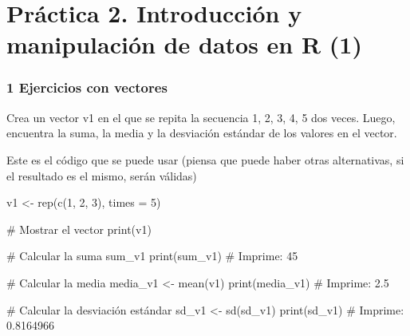 \documentclass[
  letterpaper,
  DIV=11,
  numbers=noendperiod]{scrreprt}
\newenvironment{Shaded}{\begin{snugshade}}{\end{snugshade}}
\newcommand{\AttributeTok}[1]{\textcolor[rgb]{0.40,0.45,0.13}{#1}}
\newcommand{\CommentTok}[1]{\textcolor[rgb]{0.37,0.37,0.37}{#1}}
\newcommand{\DecValTok}[1]{\textcolor[rgb]{0.68,0.00,0.00}{#1}}
\newcommand{\FunctionTok}[1]{\textcolor[rgb]{0.28,0.35,0.67}{#1}}
\newcommand{\NormalTok}[1]{\textcolor[rgb]{0.00,0.23,0.31}{#1}}
\newcommand{\OtherTok}[1]{\textcolor[rgb]{0.00,0.23,0.31}{#1}}
\begin{document}
\hypertarget{section}{%
\section{}\label{section}}

\hypertarget{pruxe1ctica-2.-introducciuxf3n-y-manipulaciuxf3n-de-datos-en-r-1-1}{%
\chapter{\texorpdfstring{{Práctica 2. Introducción y manipulación de
datos en R
(1)}}{Práctica 2. Introducción y manipulación de datos en R (1)}}\label{pruxe1ctica-2.-introducciuxf3n-y-manipulaciuxf3n-de-datos-en-r-1-1}}

\hypertarget{ejercicios-con-vectores-1}{%
\subsection{1 Ejercicios con vectores}\label{ejercicios-con-vectores-1}}

Crea un vector v1 en el que se repita la secuencia 1, 2, 3, 4, 5 dos
veces. Luego, encuentra la suma, la media y la desviación estándar de
los valores en el vector.

Este es el código que se puede usar (piensa que puede haber otras
alternativas, si el resultado es el mismo, serán válidas)

\begin{Shaded}
\begin{Highlighting}[]
\NormalTok{v1 }\OtherTok{\textless{}{-}} \FunctionTok{rep}\NormalTok{(}\FunctionTok{c}\NormalTok{(}\DecValTok{1}\NormalTok{, }\DecValTok{2}\NormalTok{, }\DecValTok{3}\NormalTok{), }\AttributeTok{times =} \DecValTok{5}\NormalTok{)}

\CommentTok{\# Mostrar el vector}
\FunctionTok{print}\NormalTok{(v1)}


\CommentTok{\# Calcular la suma}
\NormalTok{sum\_v1}
\FunctionTok{print}\NormalTok{(sum\_v1)}
\CommentTok{\# Imprime: 45}

\CommentTok{\# Calcular la media}
\NormalTok{media\_v1 }\OtherTok{\textless{}{-}} \FunctionTok{mean}\NormalTok{(v1)}
\FunctionTok{print}\NormalTok{(media\_v1)}
\CommentTok{\# Imprime: 2.5}

\CommentTok{\# Calcular la desviación estándar}
\NormalTok{sd\_v1 }\OtherTok{\textless{}{-}} \FunctionTok{sd}\NormalTok{(sd\_v1)}
\FunctionTok{print}\NormalTok{(sd\_v1)}
\CommentTok{\# Imprime: 0.8164966}
\end{Highlighting}
\end{Shaded}
\end{document}
